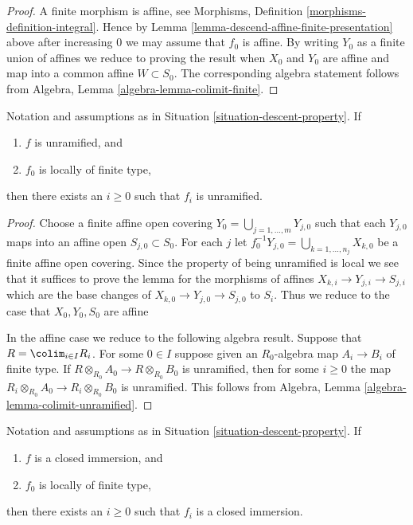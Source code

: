 \begin{proof}
A finite morphism is affine, see
Morphisms, Definition \ref{morphisms-definition-integral}.
Hence by Lemma \ref{lemma-descend-affine-finite-presentation} above
after increasing $0$ we may assume that $f_0$ is affine.
By writing $Y_0$ as a finite union of affines we reduce to proving
the result when $X_0$ and $Y_0$ are affine and map
into a common affine $W \subset S_0$. The corresponding algebra
statement follows from Algebra, Lemma \ref{algebra-lemma-colimit-finite}.
\end{proof}

\begin{lemma}
\label{lemma-descend-unramified}
Notation and assumptions as in Situation \ref{situation-descent-property}.
If
\begin{enumerate}
\item $f$ is unramified, and
\item $f_0$ is locally of finite type,
\end{enumerate}
then there exists an $i \geq 0$ such that $f_i$ is unramified.
\end{lemma}

\begin{proof}
Choose a finite affine open covering
$Y_0 = \bigcup_{j = 1, \ldots, m} Y_{j, 0}$
such that each $Y_{j, 0}$ maps into an affine open
$S_{j, 0} \subset S_0$. For each $j$ let
$f_0^{-1}Y_{j, 0} = \bigcup_{k = 1, \ldots, n_j} X_{k, 0}$ be a
finite affine open covering. Since the property of being unramified is
local we see that it suffices to prove the lemma for the morphisms
of affines $X_{k, i} \to Y_{j, i} \to S_{j, i}$ which are the base
changes of $X_{k, 0} \to Y_{j, 0} \to S_{j, 0}$ to $S_i$.
Thus we reduce to the case that $X_0, Y_0, S_0$ are affine

\medskip\noindent
In the affine case we reduce to the following algebra result.
Suppose that $R = \colim_{i \in I} R_i$. For some $0 \in I$
suppose given an $R_0$-algebra map $A_i \to B_i$ of finite type.
If $R \otimes_{R_0} A_0 \to R \otimes_{R_0} B_0$ is unramified, then
for some $i \geq 0$ the map
$R_i \otimes_{R_0} A_0 \to R_i \otimes_{R_0} B_0$ is unramified.
This follows from Algebra,
Lemma \ref{algebra-lemma-colimit-unramified}.
\end{proof}

\begin{lemma}
\label{lemma-descend-closed-immersion-finite-presentation}
Notation and assumptions as in Situation \ref{situation-descent-property}.
If
\begin{enumerate}
\item $f$ is a closed immersion, and
\item $f_0$ is locally of finite type,
\end{enumerate}
then there exists an $i \geq 0$ such that $f_i$ is a closed immersion.
\end{lemma}

